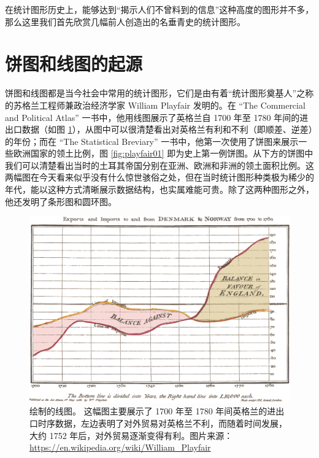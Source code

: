 \documentclass[
  b5paper,
  UTF8,twoside]{book}
\begin{document}
在统计图形历史上，能够达到``揭示人们不曾料到的信息''这种高度的图形并不多，那么这里我们首先欣赏几幅前人创造出的名垂青史的统计图形。

\hypertarget{sec:pie-and-line-of-history}{%
\section{饼图和线图的起源}\label{sec:pie-and-line-of-history}}

饼图和线图都是当今社会中常用的统计图形，它们是由有着``统计图形奠基人''之称的苏格兰工程师兼政治经济学家 William Playfair 发明的。在 ``The Commercial and Political Atlas'' \citep{Playfair86} 一书中，他用线图展示了英格兰自 1700 年至 1780 年间的进出口数据（如图 \ref{fig:playfair86}），从图中可以很清楚看出对英格兰有利和不利（即顺差、逆差）的年份；而在 ``The Statistical Breviary'' \citep{Playfair01} 一书中，他第一次使用了饼图来展示一些欧洲国家的领土比例，图 \ref{fig:playfair01} 即为史上第一例饼图。从下方的饼图中我们可以清楚看出当时的土耳其帝国分别在亚洲、欧洲和非洲的领土面积比例。这两幅图在今天看来似乎没有什么惊世骇俗之处，但在当时统计图形种类极为稀少的年代，能以这种方式清晰展示数据结构，也实属难能可贵。除了这两种图形之外，他还发明了条形图和圆环图。

\begin{figure}

{\centering \includegraphics{images/Playfair-TimeSeries} 

}

\caption[William Playfair 的时序线图 ]{\citet{Playfair86} 绘制的线图。 这幅图主要展示了 1700 年至 1780 年间英格兰的进出口时序数据，左边表明了对外贸易对英格兰不利，而随着时间发展，大约 1752 年后，对外贸易逐渐变得有利。图片来源： \url{https://en.wikipedia.org/wiki/William_Playfair}}\label{fig:playfair86}
\end{figure}
\end{document}
